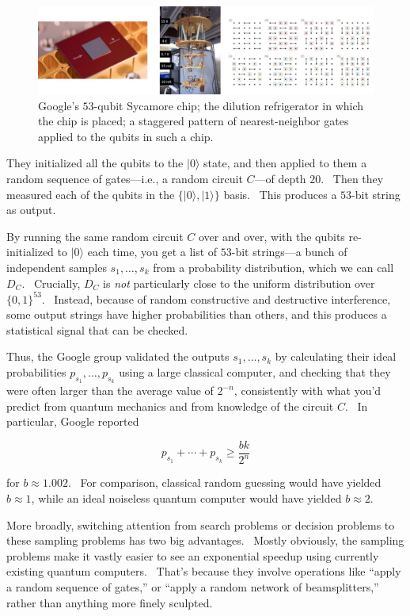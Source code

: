 \documentclass[12pt]{article}
\begin{document}
\begin{figure}
\includegraphics[width=5.7in]{google.jpg}
\caption{Google's $53$-qubit Sycamore chip; the dilution refrigerator in which the chip is placed; a staggered pattern of nearest-neighbor gates applied to the qubits in such a chip.}
\label{google}
\end{figure}

They initialized all the qubits to the $|0\rangle$ state, and then applied to them a random sequence of gates---i.e., a random circuit $C$---of depth $20$. \ Then they measured each of the qubits in the $\{ |0\rangle, |1\rangle \}$ basis. \ This produces a $53$-bit string as output.

By running the same random circuit $C$ over and over, with the qubits re-initialized to $|0\rangle$ each time, you get a list of $53$-bit strings---a bunch of independent samples $s_1,\ldots,s_k$ from a probability distribution, which we can call $D_C$. \ Crucially, $D_C$ is \emph{not} particularly close to the uniform distribution over $\{0,1\}^{53}$. \ Instead, because of random constructive and destructive interference, some output strings have higher probabilities than others, and this produces a statistical signal that can be checked.

Thus, the Google group validated the outputs $s_1,\ldots,s_k$ by calculating their ideal probabilities $p_{s_1},\ldots,p_{s_k}$ using a large classical computer, and checking that they were often larger than the average value of $2^{-n}$, consistently with what you'd predict from quantum mechanics and from knowledge of the circuit $C$. \ In particular, Google reported

$$ p_{s_1} + \cdots + p_{s_k} \ge \frac{bk}{2^n}$$

\noindent for $b\approx 1.002$. \ For comparison, classical random guessing would have yielded $b\approx 1$, while an ideal noiseless quantum computer would have yielded $b\approx 2$.

More broadly, switching attention from search problems or decision problems to these sampling problems has two big advantages. \ Mostly obviously, the sampling problems make it vastly easier to see an exponential speedup using currently existing quantum computers. \ That's because they involve operations like ``apply a random sequence of gates,'' or ``apply a random network of beamsplitters,'' rather than anything more finely sculpted.
\end{document}
